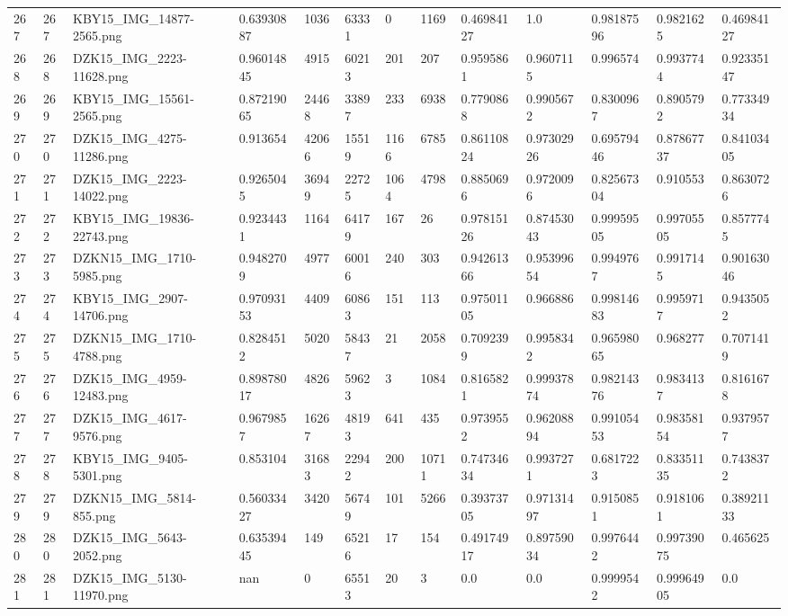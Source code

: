 \documentclass[11pt, a4paper, twoside]{report}
\begin{document}
\begin{longtable}[c]{@{}lllllllllllll@{}}
267 & 267 & KBY15\_IMG\_14877-2565.png & 0.63930887 & 1036 & 63331 & 0 & 1169 & 0.46984127 & 1.0 & 0.98187596 & 0.9821625 & 0.46984127 \\
268 & 268 & DZK15\_IMG\_2223-11628.png & 0.96014845 & 4915 & 60213 & 201 & 207 & 0.9595861 & 0.9607115 & 0.996574 & 0.9937744 & 0.92335147 \\
269 & 269 & KBY15\_IMG\_15561-2565.png & 0.87219065 & 24468 & 33897 & 233 & 6938 & 0.7790868 & 0.9905672 & 0.8300967 & 0.8905792 & 0.77334934 \\
270 & 270 & DZK15\_IMG\_4275-11286.png & 0.913654 & 42066 & 15519 & 1166 & 6785 & 0.86110824 & 0.97302926 & 0.69579446 & 0.87867737 & 0.84103405 \\
271 & 271 & DZK15\_IMG\_2223-14022.png & 0.9265045 & 36949 & 22725 & 1064 & 4798 & 0.8850696 & 0.9720096 & 0.82567304 & 0.910553 & 0.8630726 \\
272 & 272 & KBY15\_IMG\_19836-22743.png & 0.9234431 & 1164 & 64179 & 167 & 26 & 0.97815126 & 0.87453043 & 0.99959505 & 0.99705505 & 0.8577745 \\
273 & 273 & DZKN15\_IMG\_1710-5985.png & 0.9482709 & 4977 & 60016 & 240 & 303 & 0.94261366 & 0.95399654 & 0.9949767 & 0.9917145 & 0.90163046 \\
274 & 274 & KBY15\_IMG\_2907-14706.png & 0.97093153 & 4409 & 60863 & 151 & 113 & 0.97501105 & 0.966886 & 0.99814683 & 0.9959717 & 0.9435052 \\
275 & 275 & DZKN15\_IMG\_1710-4788.png & 0.8284512 & 5020 & 58437 & 21 & 2058 & 0.7092399 & 0.9958342 & 0.96598065 & 0.968277 & 0.7071419 \\
276 & 276 & DZK15\_IMG\_4959-12483.png & 0.89878017 & 4826 & 59623 & 3 & 1084 & 0.8165821 & 0.99937874 & 0.98214376 & 0.9834137 & 0.8161678 \\
277 & 277 & DZK15\_IMG\_4617-9576.png & 0.9679857 & 16267 & 48193 & 641 & 435 & 0.9739552 & 0.96208894 & 0.99105453 & 0.98358154 & 0.9379577 \\
278 & 278 & KBY15\_IMG\_9405-5301.png & 0.853104 & 31683 & 22942 & 200 & 10711 & 0.74734634 & 0.9937271 & 0.6817223 & 0.83351135 & 0.7438372 \\
279 & 279 & DZKN15\_IMG\_5814-855.png & 0.56033427 & 3420 & 56749 & 101 & 5266 & 0.39373705 & 0.97131497 & 0.9150851 & 0.9181061 & 0.38921133 \\
280 & 280 & DZK15\_IMG\_5643-2052.png & 0.63539445 & 149 & 65216 & 17 & 154 & 0.49174917 & 0.89759034 & 0.9976442 & 0.99739075 & 0.465625 \\
281 & 281 & DZK15\_IMG\_5130-11970.png & nan & 0 & 65513 & 20 & 3 & 0.0 & 0.0 & 0.9999542 & 0.99964905 & 0.0 \\

\end{longtable}
\end{document}
